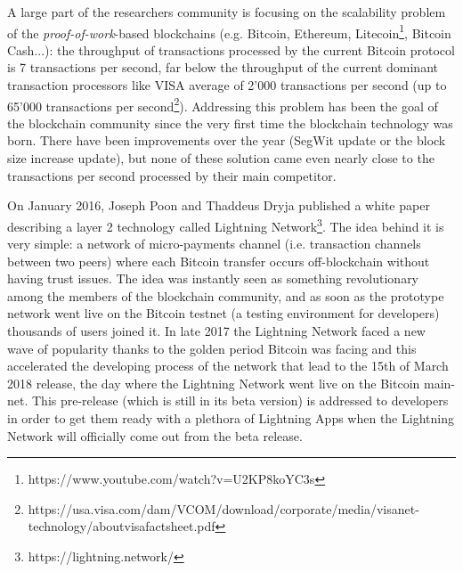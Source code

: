 		A large part of the researchers community is focusing on the scalability problem of the \textit{proof-of-work}-based blockchains (e.g. Bitcoin, Ethereum, Litecoin\footnote{https://www.youtube.com/watch?v=U2KP8koYC3s}, Bitcoin Cash...): the throughput of transactions processed by the current Bitcoin protocol is 7 transactions per second, far below the throughput of the current dominant transaction processors like VISA average of 2'000 transactions per second (up to 65'000 transactions per second\footnote{https://usa.visa.com/dam/VCOM/download/corporate/media/visanet-technology/aboutvisafactsheet.pdf}). Addressing this problem has been the goal of the blockchain community since the very first time the blockchain technology was born. There have been improvements over the year (SegWit update or the block size increase update), but none of these solution came even nearly close to the transactions per second processed by their main competitor.

		On January 2016, Joseph Poon and Thaddeus Dryja published a white paper describing a layer 2 technology called Lightning Network\footnote{https://lightning.network/}. The idea behind it is very simple: a network of micro-payments channel (i.e. transaction channels between two peers) where each Bitcoin transfer occurs off-blockchain without having trust issues. The idea was instantly seen as something revolutionary among the members of the blockchain community, and as soon as the prototype network went live on the Bitcoin testnet (a testing environment for developers) thousands of users joined it. In late 2017 the Lightning Network faced a new wave of popularity thanks to the golden period Bitcoin was facing and this accelerated the developing process of the network that lead to the 15th of March 2018 release, the day where the Lightning Network went live on the Bitcoin main-net. This pre-release (which is still in its beta version) is addressed to developers in order to get them ready with a plethora of Lightning Apps when the Lightning Network will officially come out from the beta release.
		
